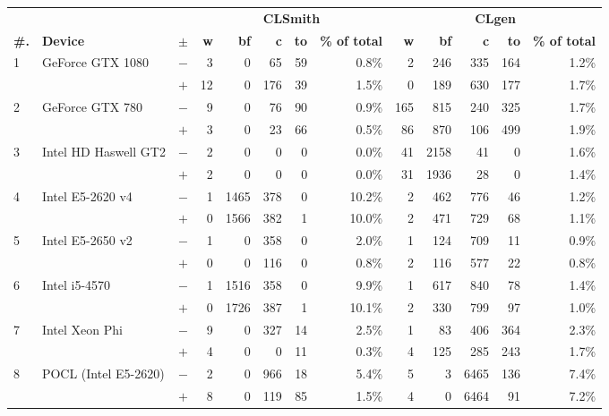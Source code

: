  \begin{tabular}{lll | rrrrr | rrrrr }
  \toprule
  & & & \multicolumn{5}{c|}{\textbf{CLSmith}} & \multicolumn{5}{c}{\textbf{CLgen}} \\
  \textbf{\#.} & \textbf{Device} & $\pm$ &
  \textbf{w} & \textbf{bf} & \textbf{c} & \textbf{to} & \textbf{\% of total} &
  \textbf{w} & \textbf{bf} & \textbf{c} & \textbf{to} & \textbf{\% of total} \\
  \midrule
  \multirow{ 2}{*}{1} & \multirow{ 2}{*}{GeForce GTX 1080} & $-$ & 3 & 0 & 65 & 59 & 0.8\%       & 2 & 246 & 335 & 164 & 1.2\% \\& & $+$ & 12 & 0 & 176 & 39 & 1.5\% & 0 & 189 & 630 & 177 & 1.7\% \\
\hline
\multirow{ 2}{*}{2} & \multirow{ 2}{*}{GeForce GTX 780} & $-$ & 9 & 0 & 76 & 90 & 0.9\%       & 165 & 815 & 240 & 325 & 1.7\% \\& & $+$ & 3 & 0 & 23 & 66 & 0.5\% & 86 & 870 & 106 & 499 & 1.9\% \\
\hline
\multirow{ 2}{*}{3} & \multirow{ 2}{*}{Intel HD Haswell GT2} & $-$ & 2 & 0 & 0 & 0 & 0.0\%       & 41 & 2158 & 41 & 0 & 1.6\% \\& & $+$ & 2 & 0 & 0 & 0 & 0.0\% & 31 & 1936 & 28 & 0 & 1.4\% \\
\hline
\multirow{ 2}{*}{4} & \multirow{ 2}{*}{Intel E5-2620 v4} & $-$ & 1 & 1465 & 378 & 0 & 10.2\%       & 2 & 462 & 776 & 46 & 1.2\% \\& & $+$ & 0 & 1566 & 382 & 1 & 10.0\% & 2 & 471 & 729 & 68 & 1.1\% \\
\hline
\multirow{ 2}{*}{5} & \multirow{ 2}{*}{Intel E5-2650 v2} & $-$ & 1 & 0 & 358 & 0 & 2.0\%       & 1 & 124 & 709 & 11 & 0.9\% \\& & $+$ & 0 & 0 & 116 & 0 & 0.8\% & 2 & 116 & 577 & 22 & 0.8\% \\
\hline
\multirow{ 2}{*}{6} & \multirow{ 2}{*}{Intel i5-4570} & $-$ & 1 & 1516 & 358 & 0 & 9.9\%       & 1 & 617 & 840 & 78 & 1.4\% \\& & $+$ & 0 & 1726 & 387 & 1 & 10.1\% & 2 & 330 & 799 & 97 & 1.0\% \\
\hline
\multirow{ 2}{*}{7} & \multirow{ 2}{*}{Intel Xeon Phi} & $-$ & 9 & 0 & 327 & 14 & 2.5\%       & 1 & 83 & 406 & 364 & 2.3\% \\& & $+$ & 4 & 0 & 0 & 11 & 0.3\% & 4 & 125 & 285 & 243 & 1.7\% \\
\hline
\multirow{ 2}{*}{8} & \multirow{ 2}{*}{POCL (Intel E5-2620)} & $-$ & 2 & 0 & 966 & 18 & 5.4\%       & 5 & 3 & 6465 & 136 & 7.4\% \\& & $+$ & 8 & 0 & 119 & 85 & 1.5\% & 4 & 0 & 6464 & 91 & 7.2\% \\

\end{tabular}
